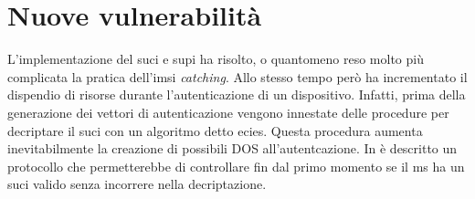 \section{Nuove vulnerabilità}
L'implementazione del \gls{suci} e \gls{supi} ha risolto, o quantomeno reso molto più complicata la pratica dell'\gls{imsi} \textit{catching}. Allo stesso tempo però ha incrementato il dispendio di risorse durante l'autenticazione
di un dispositivo. Infatti, prima della generazione dei vettori di autenticazione vengono innestate delle procedure per decriptare il \gls{suci} con un algoritmo detto 
\gls{ecies}. 
Questa procedura aumenta inevitabilmente la creazione di possibili DOS all'autentcazione. 
In \cite{5g-lightweight} è descritto un protocollo che permetterebbe di controllare fin dal primo momento se il \gls{ms} ha un \gls{suci} valido senza incorrere nella decriptazione.